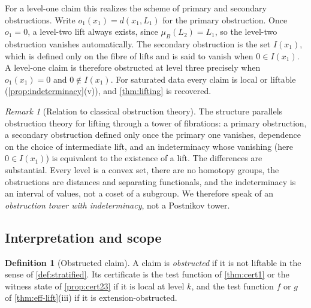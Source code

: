 \documentclass[11pt]{article}
\theoremstyle{definition}
\newtheorem{definition}[theorem]{Definition}
\theoremstyle{remark}
\newtheorem{remark}[theorem]{Remark}
\begin{document}
For a level-one claim this realizes the scheme of primary and secondary obstructions. Write
$o_1(x_1)=d(x_1,L_1)$ for the primary obstruction. Once $o_1=0$, a level-two lift always exists, since
$\mu_B(L_2)=L_1$, so the level-two obstruction vanishes automatically. The secondary obstruction is the
set $I(x_1)$, which is defined only on the fibre of lifts and is said to vanish when $0\in I(x_1)$. A
level-one claim is therefore obstructed at level three precisely when $o_1(x_1)=0$ and $0\notin
I(x_1)$. For saturated data every claim is local or liftable (\cref{prop:indeterminacy}(v)), and
\cref{thm:lifting} is recovered.

\begin{remark}[Relation to classical obstruction theory]\label{rem:obstruction-analogy}
The structure parallels obstruction theory for lifting through a tower of fibrations: a primary
obstruction, a secondary obstruction defined only once the primary one vanishes, dependence on the
choice of intermediate lift, and an indeterminacy whose vanishing (here $0\in I(x_1)$) is equivalent to
the existence of a lift. The differences are substantial. Every level is a convex set, there are no
homotopy groups, the obstructions are distances and separating functionals, and the indeterminacy is
an interval of values, not a coset of a subgroup. We therefore speak of an \emph{obstruction tower
with indeterminacy}, not a Postnikov tower.
\end{remark}

\subsection{Interpretation and scope}

\begin{definition}[Obstructed claim]
A claim is \emph{obstructed} if it is not liftable in the sense of \cref{def:stratified}. Its
certificate is the test function of \cref{thm:cert1} or the witness state of \cref{prop:cert23} if it
is local at level $k$, and the test function $f$ or $g$ of \cref{thm:eff-lift}(iii) if it is
extension-obstructed.
\end{definition}
\end{document}
